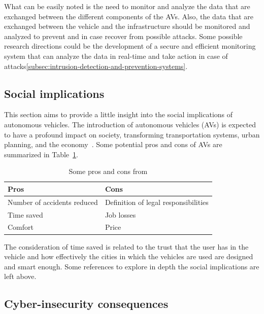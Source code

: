 What can be easily noted is the need to monitor and analyze the data that are exchanged between the different components of the AVs.
Also, the data that are exchanged between the vehicle and the infrastructure should be monitored and analyzed to prevent and in case recover from possible attacks.
Some possible research directions could be the development of a secure and efficient monitoring system that can analyze the data in real-time and take action in case of attacks\ref{subsec:intrusion-detection-and-prevention-systems}.

\subsection{Social implications}\label{subsec:social-implications}

This section aims to provide a little insight into the social implications of autonomous vehicles.
The introduction of autonomous vehicles (AVs) is expected to have a profound impact on society\cite{thomas2020perception},
transforming transportation systems\cite{intelligent_transportation_2023}, urban planning\cite{impact_autonomous_vehicles_2018},
and the economy~\cite{economic_aspects_2020}.
Some potential pros and cons of AVs are summarized in Table~\ref{tab:table}.

\begin{table}[ht]
    \centering
    \begin{tabular}{|l|l|}
        \hline
        \textbf{Pros} & \textbf{Cons} \\ \hline
        Number of accidents reduced & Definition of legal responsibilities \\ \hline
        Time saved & Job losses \\ \hline
        Comfort & Price \\ \hline
    \end{tabular}
    \caption{Some pros and cons from \cite{ahangar2021survey} }\label{tab:table}
\end{table}

The consideration of time saved
is related to the trust that the user has in the vehicle and how effectively the cities in which the vehicles are used are designed and smart enough.
Some references to explore in depth the social implications are left above.

\subsection{Cyber-insecurity consequences}\label{subsec:cyber-insecurity}

